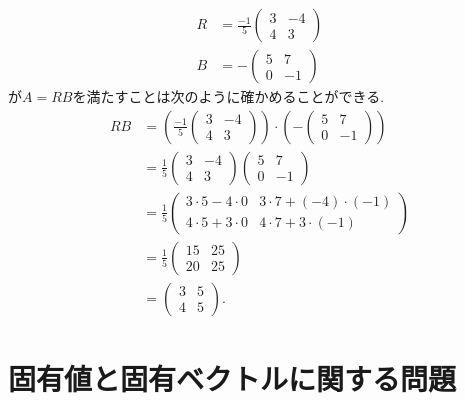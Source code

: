 \begin{checkanswer}%
\begin{align*}
  R&=\frac{-1}{5}\begin{pmatrix}3&-4\\4&3\end{pmatrix}\\
  B&=-\begin{pmatrix}5&7\\0&-1\end{pmatrix}
\end{align*}
が$A=RB$を満たすことは次のように確かめることができる.
\begin{align*}
  RB&=(\frac{-1}{5}\begin{pmatrix}3&-4\\4&3\end{pmatrix})\cdot(-\begin{pmatrix}5&7\\0&-1\end{pmatrix})\\
    &=\frac{1}{5}\begin{pmatrix}3&-4\\4&3\end{pmatrix}\begin{pmatrix}5&7\\0&-1\end{pmatrix}\\
        &=\frac{1}{5}\begin{pmatrix}3\cdot 5-4\cdot 0&3\cdot 7+(-4)\cdot(-1)\\
          4\cdot 5+3\cdot 0&4\cdot 7+3\cdot(-1)\end{pmatrix}\\
        &=\frac{1}{5}\begin{pmatrix}15&25\\20&25\end{pmatrix}\\
        &=\begin{pmatrix}3&5\\4&5\end{pmatrix}.
\end{align*}
\end{checkanswer}
\section{固有値と固有ベクトルに関する問題}

